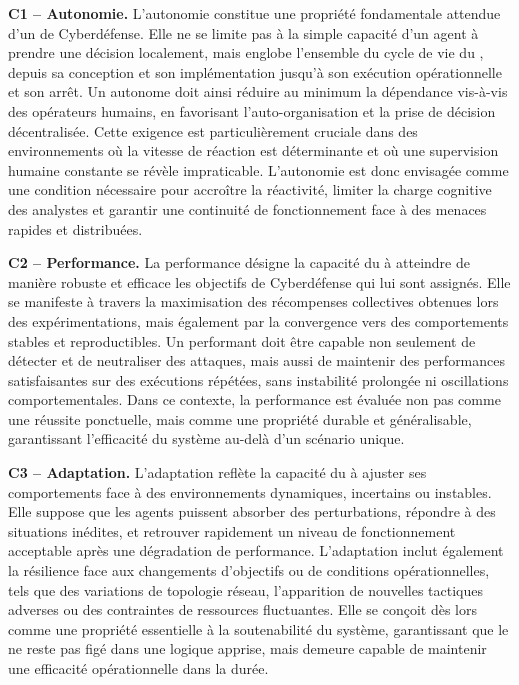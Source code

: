 \noindent
\textbf{C1 -- Autonomie.} \quad
L'autonomie constitue une propriété fondamentale attendue d'un  de Cyberdéfense. Elle ne se limite pas à la simple capacité d'un agent à prendre une décision localement, mais englobe l'ensemble du cycle de vie du , depuis sa conception et son implémentation jusqu'à son exécution opérationnelle et son arrêt. Un  autonome doit ainsi réduire au minimum la dépendance vis-à-vis des opérateurs humains, en favorisant l'auto-organisation et la prise de décision décentralisée. Cette exigence est particulièrement cruciale dans des environnements où la vitesse de réaction est déterminante et où une supervision humaine constante se révèle impraticable. L'autonomie est donc envisagée comme une condition nécessaire pour accroître la réactivité, limiter la charge cognitive des analystes et garantir une continuité de fonctionnement face à des menaces rapides et distribuées.

\medskip

\noindent
\textbf{C2 -- Performance.} \quad
La performance désigne la capacité du  à atteindre de manière robuste et efficace les objectifs de Cyberdéfense qui lui sont assignés. Elle se manifeste à travers la maximisation des récompenses collectives obtenues lors des expérimentations, mais également par la convergence vers des comportements stables et reproductibles. Un  performant doit être capable non seulement de détecter et de neutraliser des attaques, mais aussi de maintenir des performances satisfaisantes sur des exécutions répétées, sans instabilité prolongée ni oscillations comportementales. Dans ce contexte, la performance est évaluée non pas comme une réussite ponctuelle, mais comme une propriété durable et généralisable, garantissant l'efficacité du système au-delà d'un scénario unique.

\medskip

\noindent
\textbf{C3 -- Adaptation.} \quad
L'adaptation reflète la capacité du  à ajuster ses comportements face à des environnements dynamiques, incertains ou instables. Elle suppose que les agents puissent absorber des perturbations, répondre à des situations inédites, et retrouver rapidement un niveau de fonctionnement acceptable après une dégradation de performance. L'adaptation inclut également la résilience face aux changements d'objectifs ou de conditions opérationnelles, tels que des variations de topologie réseau, l'apparition de nouvelles tactiques adverses ou des contraintes de ressources fluctuantes. Elle se conçoit dès lors comme une propriété essentielle à la soutenabilité du système, garantissant que le  ne reste pas figé dans une logique apprise, mais demeure capable de maintenir une efficacité opérationnelle dans la durée.

